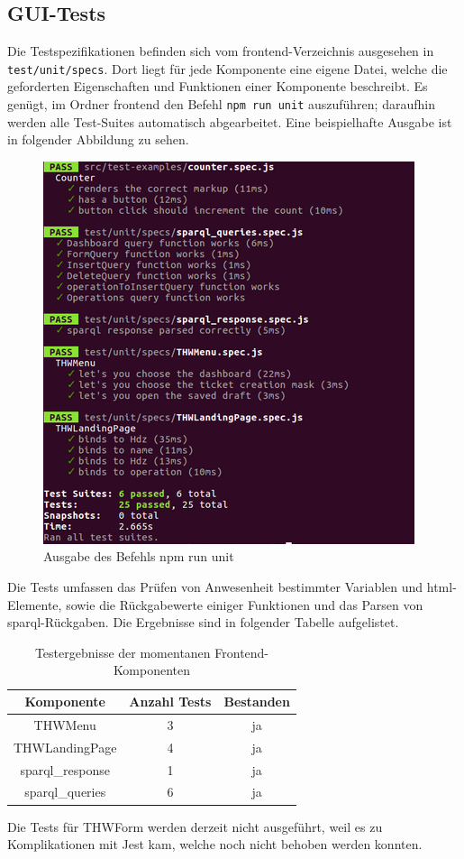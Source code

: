 \documentclass[a4paper,11pt,oneside, titlepage]{article}
\begin{document}
\subsection{GUI-Tests}
Die Testspezifikationen befinden sich vom frontend-Verzeichnis ausgesehen in \verb+test/unit/specs+.
Dort liegt für jede Komponente eine eigene Datei, welche die geforderten Eigenschaften und Funktionen einer Komponente beschreibt. Es genügt, im Ordner frontend den Befehl \verb+npm run unit+ auszuführen; daraufhin werden alle Test-Suites automatisch abgearbeitet. Eine beispielhafte Ausgabe ist in folgender Abbildung zu sehen.
\newline
\begin{figure}[htpb]
\centering
\includegraphics[width=0.8\linewidth]{test}
\caption{Ausgabe des Befehls npm run unit}
\label{fig:npmtest}
\end{figure}
\newpage
Die Tests umfassen das Prüfen von Anwesenheit bestimmter Variablen und html-Elemente, sowie die Rückgabewerte einiger Funktionen und das Parsen von sparql-Rückgaben.
Die Ergebnisse sind in folgender Tabelle aufgelistet.
\begin{table}[htpb]
\centering
\label{tab:test}
\begin{tabular}{c | c | c}
Komponente & Anzahl Tests & Bestanden \\
\hline
THWMenu & 3 & ja \\
THWLandingPage & 4 & ja\\
sparql\_response & 1 & ja\\
sparql\_queries & 6 & ja\\
\end{tabular}

\caption{Testergebnisse der momentanen Frontend-Komponenten}
\end{table}
Die Tests für THWForm werden derzeit nicht ausgeführt, weil es zu Komplikationen mit Jest kam, welche noch nicht behoben werden konnten.
\end{document}
